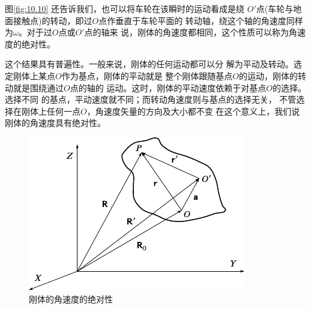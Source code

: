 图\ref{fig:10.10} 还告诉我们，也可以将车轮在该瞬时的运动看成是绕
$ O' $点(车轮与地面接触点)的转动，即过$ O $点作垂直于车轮平面的
转动轴，绕这个轴的角速度同样为$ \omega $。对于过$ O $点或$ O' $点的轴来
说，刚体的角速度都相同，这个性质可以称为角速度的绝对性。

这个结果具有普遍性。一般来说，刚体的任何运动都可以分
解为平动及转动。选定刚体上某点$ O $作为基点，刚体的平动就是
整个刚体跟随基点$ O $的运动，刚体的转动就是围绕通过$ O $点的轴的
运动。这时，刚体的平动速度依赖于对基点$ O $的选择。选择不同
的基点，平动速度就不同；而转动角速度则与基点的选择无关，
不管选择在刚体上任何一点$ O $，角速度矢量的方向及大小都不变
在这个意义上，我们说刚体的角速度具有绝对性。

\begin{figure}[h]
    \centering
    \includegraphics{figure/fig10.11}
    \caption{刚体的角速度的绝对性}
    \label{fig:10.11}
\end{figure}


